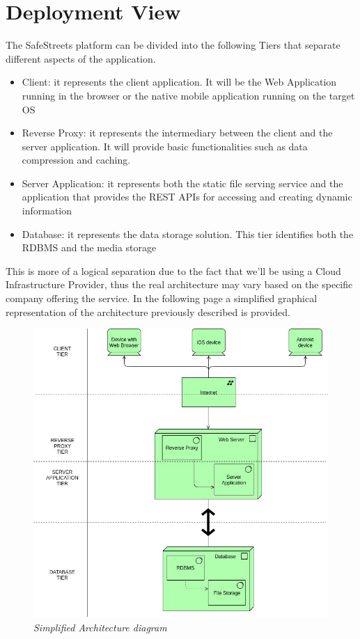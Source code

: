 \section{Deployment View}

The SafeStreets platform can be divided into the following Tiers that separate different aspects of the application.
\begin{itemize}
  \item Client: it represents the client application. It will be the Web Application running in the browser or the native mobile application running on the target OS
  \item Reverse Proxy: it represents the intermediary between the client and the server application. It will provide basic functionalities such as data compression and caching.
  \item Server Application: it represents both the static file serving service and the application that provides the REST APIs for accessing and creating dynamic information
  \item Database: it represents the data storage solution. This tier identifies both the RDBMS and the media storage
\end{itemize}


This is more of a logical separation due to the fact that we'll be using a Cloud Infrastructure Provider, thus the real architecture may vary
based on the specific company offering the service.
\newline
\newline
In the following page a simplified graphical representation of the architecture previously described is provided.
\newpage

\begin{figure}[H]
  \centering
  \includegraphics[origin=c,width=\textwidth,height=.95\textheight,keepaspectratio]{DD_Images/DeploymentView.jpg}
  \caption{\textit{Simplified Architecture diagram}}
\end{figure}